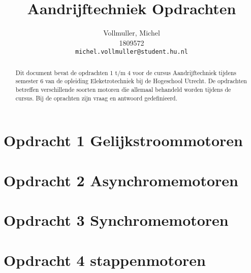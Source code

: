\documentclass{article}
\title{Aandrijftechniek Opdrachten}
\author{
  Vollmuller, Michel\\
  1809572\\
  \texttt{michel.vollmuller@student.hu.nl}
}
\begin{document}
\maketitle

\begin{abstract}
    Dit document bevat de opdrachten 1 t/m 4 voor de cursus Aandrijftechniek tijdens semester 6 van de opleiding Eleketrotechniek bij de Hogeschool Utrecht. De opdrachten betreffen verschillende soorten motoren die allemaal behandeld worden tijdens de cursus. Bij de oprachten zijn vraag en antwoord gedefinieerd.
\end{abstract}

\tableofcontents

\newpage

\section{Opdracht 1 Gelijkstroommotoren}


\newpage
\section{Opdracht 2 Asynchromemotoren}


\newpage
\section{Opdracht 3 Synchromemotoren}


\newpage
\section{Opdracht 4 stappenmotoren}

\end{document}
